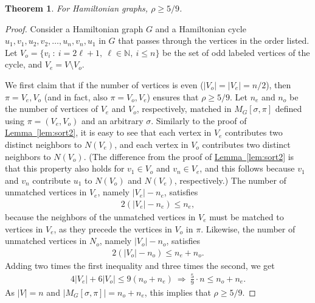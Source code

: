 \documentclass[11pt]{article}
\numberwithin{equation}{section}
\newtheorem{theorem}{Theorem}[section]
\theoremstyle{definition}
\theoremstyle{plain}
\newcommand{\expref}[2]{\hyperref[#2]{#1~\ref{#2}}}
\theoremstyle{plain}
\begin{document}
\begin{theorem}
%
%
%
%
  For Hamiltonian graphs, $\rho \ge 5/9$.
%
	\label{thm:hamiltonian-5-9}
\end{theorem}

\begin{proof}
Consider a Hamiltonian graph $G$ and a Hamiltonian cycle $u_1,v_1,u_2,v_2,\ldots, u_n,v_n,u_1$ 
%
%
in $G$ that passes through the vertices in the order listed. %
Let $V_o=\{v_i\ :\ i=2\ell+1,\ \ell\in \mathbb{N},\ i\leq n \}$ be the set of odd labeled vertices of the cycle, and $V_e=V\setminus V_o$.
	
	We first claim that if the number of vertices is even 
%
($|V_o|=|V_e|=n/2$),   %
then $\pi=V_e, V_o$ (and in fact, also $\pi=V_o, V_e$) ensures that $\rho\ge 5/9$.
%
Let $n_e$ and $n_o$ be the number of vertices of $V_e$ and $V_o$, respectively,
%
matched in $M_G[\sigma,\pi]$ defined using $\pi=(V_e,V_o)$ and an arbitrary $\sigma$. %
Similarly   %
to the proof of \expref{Lemma}{lem:sort2}, it is easy to see that each vertex in $V_e$ contributes two distinct neighbors to $N(V_e)$, and each vertex in $V_o$ contributes two distinct neighbors to $N(V_o)$. %
%
(The difference from the proof of \expref{Lemma}{lem:sort2} is that this property also holds for $v_1\in V_o$ and $v_n\in V_e$, and this follows because $v_1$ and $v_n$ contribute $u_1$ to $N(V_o)$ and $N(V_e)$, respectively.)  %
 The number of unmatched vertices in $V_e$, namely $|V_e|-n_e$, satisfies \begin{eqnarray}2(|V_e|-n_e)\leq n_e,   %
	\end{eqnarray} because the neighbors of the unmatched vertices in $V_e$ must be matched to vertices in $V_e$, as they precede the vertices in $V_o$ in  $\pi$. Likewise, the number of unmatched vertices in $N_o$, namely $|V_o|-n_o$, satisfies \begin{eqnarray}2(|V_o|-n_o)\leq n_e+n_o.
\end{eqnarray} Adding two times the first inequality and three times the second, we get \begin{eqnarray}4|V_e| + 6|V_o|\leq 9(n_o+n_e)\ \Rightarrow \ \frac{5}{9}\cdot n\leq n_o+n_e.
\end{eqnarray} As $|V|=n$ and  $|M_G[\sigma,\pi]|=n_o+n_e$, this implies that 
%
$\rho\geq 5/9.$   %
	

\end{proof}
\end{document}
